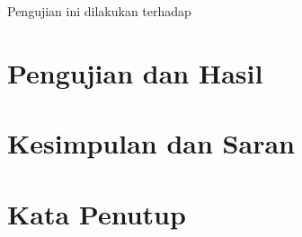 \documentclass[conference]{IEEEtran}
\begin{document}
Pengujian ini dilakukan terhadap

\section{Pengujian dan Hasil}

\section{Kesimpulan dan Saran}

\section{Kata Penutup}









\end{document}
